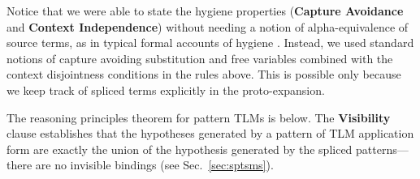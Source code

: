 \documentclass[acmsmall,screen]{acmart}
\begin{document}
Notice that we were able to state the hygiene properties (\textbf{Capture Avoidance} and \textbf{Context Independence}) without needing a notion of alpha-equivalence of source terms, as in typical formal accounts of hygiene \cite{Kohlbecker86a,DBLP:conf/popl/Adams15,DBLP:conf/popl/ClingerR91,DBLP:journals/lisp/DybvigHB92,DBLP:conf/esop/HermanW08,Herman10:Theory}. Instead, we used standard notions of capture avoiding substitution and free variables combined with the context disjointness conditions in the rules above. This is possible only because we keep track of spliced terms explicitly in the proto-expansion. %

The reasoning principles theorem for pattern TLMs is below. The \textbf{Visibility} clause establishes that the hypotheses generated by a pattern of TLM application form are exactly the union of the hypothesis generated by the spliced patterns---there are no invisible bindings (see Sec.~\ref{sec:sptsms}). %
\end{document}
